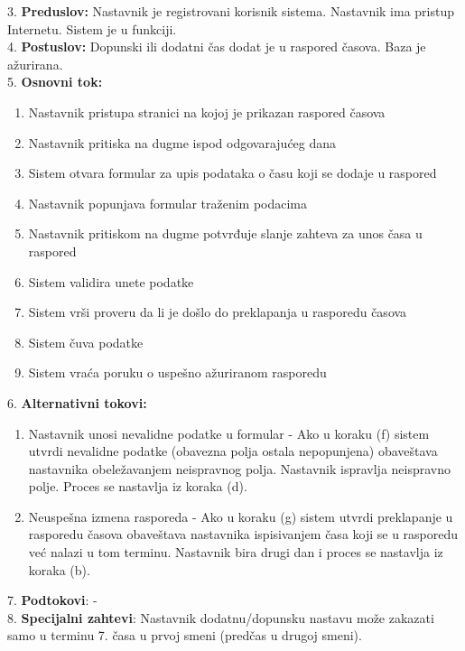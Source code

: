 \documentclass{article}
\begin{document}
3. \textbf{Preduslov:} Nastavnik je registrovani korisnik sistema. Nastavnik ima pristup Internetu. Sistem je u funkciji. \\

4. \textbf{Postuslov:} Dopunski ili dodatni čas dodat je u raspored časova. Baza je ažurirana. \\

5. \textbf{Osnovni tok:} 
\begin{enumerate} [label=(\alph*)]
\item Nastavnik pristupa stranici na kojoj je prikazan raspored časova
\item Nastavnik pritiska na dugme ispod odgovarajućeg dana  
\item Sistem otvara formular za upis podataka o času koji se dodaje u raspored
\item Nastavnik popunjava formular traženim podacima
\item Nastavnik pritiskom na dugme potvrđuje slanje zahteva za unos časa u raspored
\item Sistem validira unete podatke
\item Sistem vrši proveru da li je došlo do preklapanja u rasporedu časova
\item Sistem čuva podatke
\item Sistem vraća poruku o uspešno ažuriranom rasporedu
\end{enumerate}

6. \textbf{Alternativni tokovi:}
\begin{enumerate} [label=(\roman*)]
\item Nastavnik unosi nevalidne podatke u formular - Ako u koraku (f) sistem utvrdi nevalidne podatke (obavezna polja ostala nepopunjena) obaveštava nastavnika obeležavanjem neispravnog polja. Nastavnik ispravlja neispravno polje. Proces se nastavlja iz koraka (d).
\item Neuspešna izmena rasporeda - Ako u koraku (g) sistem utvrdi preklapanje u rasporedu časova obaveštava nastavnika ispisivanjem časa koji se u rasporedu već nalazi u tom terminu. Nastavnik bira drugi dan i proces se nastavlja iz koraka (b).

\end{enumerate}

7. \textbf{Podtokovi}: - \\

8. \textbf{Specijalni zahtevi}: Nastavnik dodatnu/dopunsku nastavu može zakazati samo u terminu 7. časa u prvoj smeni (predčas u drugoj smeni). \\
\end{document}
